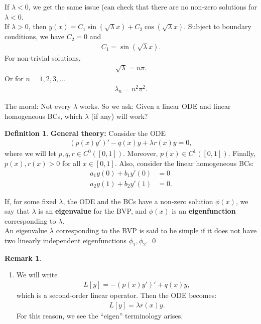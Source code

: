 \documentclass{book}
\theoremstyle{definition}
\newtheorem{defn}{Definition}[section]
\newtheorem{rmk}{Remark}[section]
\begin{document}
If $\lambda < 0$, we get the same issue (can check that there are no non-zero solutions for $\lambda< 0$. \\

If $\lambda > 0$, then $y(x) = C_1 \sin(\sqrt{\lambda} x ) + C_2 \cos(\sqrt{\lambda} x)$. Subject to boundary conditions, we have $C_2 = 0$ and
\begin{align*}
C_1 = \sin(\sqrt{\lambda} x).
\end{align*}
For non-trivial solutions,
\begin{align*}
\sqrt{\lambda}=n\pi.
\end{align*}
Or for $n=1,2,3,\dots$
\begin{align*}
\lambda_n = n^2 \pi^2.
\end{align*}

The moral: Not every $\lambda$ works. So we ask: Given a linear ODE and linear homogeneous BCs, which $\lambda$ (if any) will work?\\

\begin{defn}
	\textbf{General theory:} Consider the ODE
	\begin{align*}
	(p(x)y')' - q(x)y + \lambda r(x)y = 0,
	\end{align*}
	where we will let $p,q,r \in C^0([0,1])$. Moreover, $p(x) \in C^1([0,1])$. Finally, $p(x),r(x) > 0$ for all $x\in[0,1]$. Also, consider the linear homogeneous BCs:
	\begin{align*}
	a_1y(0) + b_1y'(0) &= 0\\
	a_2y(1) + b_2y'(1) &= 0.
	\end{align*}
	
	If, for some fixed $\lambda$, the ODE and the BCs have a non-zero solution $\phi(x)$, we say that $\lambda$ is an \textbf{eigenvalue} for the BVP, and $\phi(x)$ is an \textbf{eigenfunction} corresponding to $\lambda$. \\
	
	An eigenvalue $\lambda$ corresponding to the BVP is said to be simple if it does not have two linearly independent eigenfunctions $\phi_1, \phi_2$. 
	\qed
\end{defn}

\begin{rmk}
	$\,$\\
	\begin{enumerate}
		\item We will write 
		\begin{align*}
		L[y] = -(p(x)y')' + q(x)y,
		\end{align*}
		which is a second-order linear operator. Then the ODE becomes:
		\begin{align*}
		L[y] = \lambda r(x)y.
		\end{align*}
		For this reason, we see the ``eigen'' terminology arises. 
	\end{enumerate}
\end{rmk}
\end{document}
